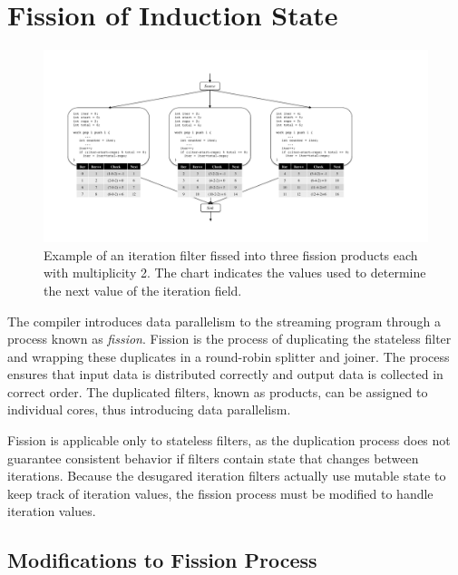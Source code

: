 \section{Fission of Induction State}
\label{sec:fission}


\begin{figure}[t!]
\centering
\includegraphics[width=6.5in]{figures/fission-example.pdf}
\caption{Example of an iteration filter fissed into three fission products each with multiplicity 2.  The chart indicates the values used to determine the next value of the iteration field.  \protect\label{fig:fission-example}}
\end{figure}

The compiler introduces data parallelism to the streaming program through a process known as {\it fission}.  Fission is the process of duplicating the stateless filter and wrapping these duplicates in a round-robin splitter and joiner.  The process ensures that input data is distributed correctly and output data is collected in correct order.  The duplicated filters, known as products, can be assigned to individual cores, thus introducing data parallelism.  

Fission is applicable only to stateless filters, as the duplication process does not guarantee consistent behavior if filters contain state that changes between iterations.  Because the desugared iteration filters actually use mutable state to keep track of iteration values, the fission process must be modified to handle iteration values.  

\subsection{Modifications to Fission Process}

